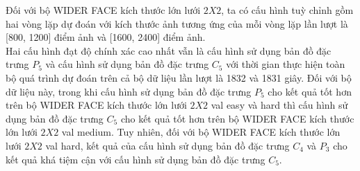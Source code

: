 {    \noindent
    Đối với bộ WIDER FACE kích thước lớn lưới $2 X 2$, ta có cấu hình tuỳ chỉnh gồm hai vòng lặp dự đoán với kích thước ảnh tương ứng của mỗi vòng lặp lần lượt là [800, 1200] điểm ảnh và [1600, 2400] điểm ảnh. \\
    Hai cấu hình đạt độ chính xác cao nhất vẫn là cấu hình sử dụng bản đồ đặc trưng ${P}_{5}$ và cấu hình sử dụng bản đồ đặc trưng ${C}_{5}$ với thời gian thực hiện toàn bộ quá trình dự đoán trên cả bộ dữ liệu lần lượt là 1832 và 1831 giây.
    Đối với bộ dữ liệu này, trong khi cấu hình sử dụng bản đồ đặc trưng ${P}_{5}$ cho kết quả tốt hơn trên bộ WIDER FACE kích thước lớn lưới $2 X 2$ val easy và hard thì cấu hình sử dụng bản đồ đặc trưng ${C}_{5}$ cho kết quả tốt hơn trên bộ WIDER FACE kích thước lớn lưới $2 X 2$ val medium.
    Tuy nhiên, đối với bộ WIDER FACE kích thước lớn lưới $2 X 2$ val hard, kết quả của cấu hình sử dụng bản đồ đặc trưng ${C}_{4}$ và ${P}_{3}$ cho kết quả khá tiệm cận với cấu hình sử dụng bản đồ đặc trưng ${C}_{5}$.

}
